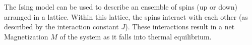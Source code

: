 \documentclass[a4paper,12pt]{article}
\begin{document}
The Ising model can be used to describe an ensemble of spins (up or down) arranged in a lattice. Within this lattice, the spins interact with each other (as described by the interaction constant $J$). These interactions result in a net Magnetization $M$ of the system as it falls into thermal equilibrium. 
\end{document}
